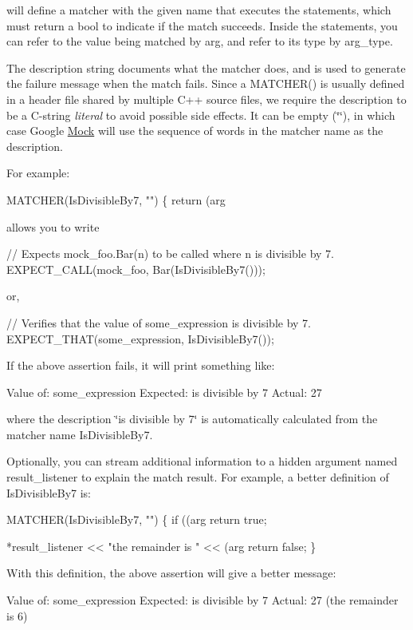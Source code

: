 will define a matcher with the given name that executes the statements, which must return a {\ttfamily bool} to indicate if the match succeeds. Inside the statements, you can refer to the value being matched by {\ttfamily arg}, and refer to its type by {\ttfamily arg\+\_\+type}.

The description string documents what the matcher does, and is used to generate the failure message when the match fails. Since a {\ttfamily M\+A\+T\+C\+H\+E\+R()} is usually defined in a header file shared by multiple C++ source files, we require the description to be a C-\/string {\itshape literal} to avoid possible side effects. It can be empty ({\ttfamily \char`\"{}\char`\"{}}), in which case Google \hyperlink{class_mock}{Mock} will use the sequence of words in the matcher name as the description.

For example\+: 
\begin{DoxyCode}
MATCHER(IsDivisibleBy7, "") \{ return (arg %
\end{DoxyCode}
 allows you to write 
\begin{DoxyCode}
// Expects mock\_foo.Bar(n) to be called where n is divisible by 7.
EXPECT\_CALL(mock\_foo, Bar(IsDivisibleBy7()));
\end{DoxyCode}
 or, 
\begin{DoxyCode}
// Verifies that the value of some\_expression is divisible by 7.
EXPECT\_THAT(some\_expression, IsDivisibleBy7());
\end{DoxyCode}
 If the above assertion fails, it will print something like\+: 
\begin{DoxyCode}
Value of: some\_expression
Expected: is divisible by 7
  Actual: 27
\end{DoxyCode}
 where the description {\ttfamily \char`\"{}is divisible by 7\char`\"{}} is automatically calculated from the matcher name {\ttfamily Is\+Divisible\+By7}.

Optionally, you can stream additional information to a hidden argument named {\ttfamily result\+\_\+listener} to explain the match result. For example, a better definition of {\ttfamily Is\+Divisible\+By7} is\+: 
\begin{DoxyCode}
MATCHER(IsDivisibleBy7, "") \{
  if ((arg %
    return true;

  *result\_listener << "the remainder is " << (arg %
  return false;
\}
\end{DoxyCode}


With this definition, the above assertion will give a better message\+: 
\begin{DoxyCode}
Value of: some\_expression
Expected: is divisible by 7
  Actual: 27 (the remainder is 6)
\end{DoxyCode}


